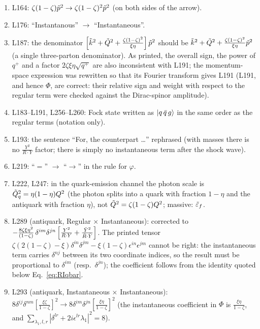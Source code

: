 \documentclass[9pt]{article}
\newcommand{\epsq}{\Tilde{\varepsilon}_{f}}  %
\numberwithin{equation}{section}
\begin{document}
\begin{enumerate}
    \item L164: $\zeta(1-\zeta)\Tilde{p}^{2}\rightarrow\zeta(1-\zeta)^{2}\Tilde{p}^{2}$ (on both sides of the arrow).
    \item L176: ``Instantanous'' $\rightarrow$ ``Instantaneous''.
    \item L187: the denominator $\left[\Tilde{k}^{2}+\Tilde{Q}^{2}+\frac{\zeta(1-\zeta)^{2}}{\xi\eta}\right]\Tilde{p}^{2}$ should be $\Tilde{k}^{2}+\Tilde{Q}^{2}+\frac{\zeta(1-\zeta)^{2}}{\xi\eta}\Tilde{p}^{2}$ (a single three-parton denominator). As printed, the overall sign, the power of $q^{+}$ and a factor $2\zeta\xi\eta\sqrt{q^{+}}$ are also inconsistent with L191; the momentum-space expression was rewritten so that its Fourier transform gives L191 (L191, and hence $\Phi$, are correct: their relative sign and weight with respect to the regular term were checked against the Dirac-spinor amplitude).
    \item L183--L191, L256--L260: Fock state written as $\ket{q\,\Bar{q}\,g}$ in the same order as the regular terms (notation only).
    \item L193: the sentence ``For, the counterpart \ldots'' rephrased (with masses there is no $\frac{Y^{2}}{R\cdot Y}$ factor; there is simply no instantaneous term after the shock wave).
    \item L219: ``$=$'' $\rightarrow$ ``$\rightarrow$'' in the rule for $\varphi$.
    \item L222, L247: in the quark-emission channel the photon scale is $\Tilde{Q}^{2}_{q}=\eta(1-\eta)Q^{2}$ (the photon splits into a quark with fraction $1-\eta$ and the antiquark with fraction $\eta$), not $\Tilde{Q}^{2}=\zeta(1-\zeta)Q^{2}$; massive: $\epsq$.
    \item L289 (antiquark, Regular $\times$ Instantaneous): corrected to $-\frac{8\zeta\xi\eta^{2}}{(1-\zeta)}\,\delta^{im}\delta^{jn}\left[\frac{Y^{2}}{R\cdot Y}+\frac{\Bar{Y}^{2}}{\Bar{R}\cdot\Bar{Y}}\right]$. The printed tensor $\zeta(2(1-\zeta)-\xi)\delta^{in}\delta^{jm}-\xi(1-\zeta)\epsilon^{in}\epsilon^{jm}$ cannot be right: the instantaneous term carries $\delta^{nj}$ between its two coordinate indices, so the result must be proportional to $\delta^{im}$ (resp.\ $\delta^{jn}$); the coefficient follows from the identity quoted below Eq.~\eqref{eq:RIqbar}.
    \item L293 (antiquark, Instantaneous $\times$ Instantaneous): $8\delta^{ij}\delta^{nm}\left[\frac{\xi\zeta}{1-\zeta}\right]^{2}\rightarrow 8\delta^{im}\delta^{jn}\left[\frac{\xi\eta}{1-\zeta}\right]^{2}$ (the instantaneous coefficient in $\Phi$ is $\frac{\xi\eta}{1-\zeta}$, and $\sum_{\lambda_{1},l,r}|\delta^{lr}+2i\epsilon^{lr}\lambda_{1}|^{2}=8$).

\end{enumerate}
\end{document}
